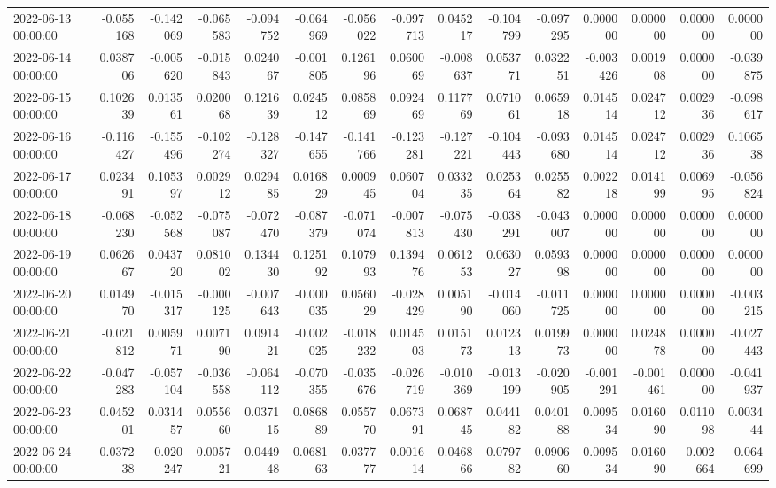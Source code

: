 \begin{tabular}{lrrrrrrrrrrrrrr}
2022-06-13 00:00:00 & -0.055168 & -0.142069 & -0.065583 & -0.094752 & -0.064969 & -0.056022 & -0.097713 & 0.045217 & -0.104799 & -0.097295 & 0.000000 & 0.000000 & 0.000000 & 0.000000 \\
2022-06-14 00:00:00 & 0.038706 & -0.005620 & -0.015843 & 0.024067 & -0.001805 & 0.126196 & 0.060069 & -0.008637 & 0.053771 & 0.032251 & -0.003426 & 0.001908 & 0.000000 & -0.039875 \\
2022-06-15 00:00:00 & 0.102639 & 0.013561 & 0.020068 & 0.121639 & 0.024512 & 0.085869 & 0.092469 & 0.117769 & 0.071061 & 0.065918 & 0.014514 & 0.024712 & 0.002936 & -0.098617 \\
2022-06-16 00:00:00 & -0.116427 & -0.155496 & -0.102274 & -0.128327 & -0.147655 & -0.141766 & -0.123281 & -0.127221 & -0.104443 & -0.093680 & 0.014514 & 0.024712 & 0.002936 & 0.106538 \\
2022-06-17 00:00:00 & 0.023491 & 0.105397 & 0.002912 & 0.029485 & 0.016829 & 0.000945 & 0.060704 & 0.033235 & 0.025364 & 0.025582 & 0.002218 & 0.014199 & 0.006995 & -0.056824 \\
2022-06-18 00:00:00 & -0.068230 & -0.052568 & -0.075087 & -0.072470 & -0.087379 & -0.071074 & -0.007813 & -0.075430 & -0.038291 & -0.043007 & 0.000000 & 0.000000 & 0.000000 & 0.000000 \\
2022-06-19 00:00:00 & 0.062667 & 0.043720 & 0.081002 & 0.134430 & 0.125192 & 0.107993 & 0.139476 & 0.061253 & 0.063027 & 0.059398 & 0.000000 & 0.000000 & 0.000000 & 0.000000 \\
2022-06-20 00:00:00 & 0.014970 & -0.015317 & -0.000125 & -0.007643 & -0.000035 & 0.056029 & -0.028429 & 0.005190 & -0.014060 & -0.011725 & 0.000000 & 0.000000 & 0.000000 & -0.003215 \\
2022-06-21 00:00:00 & -0.021812 & 0.005971 & 0.007190 & 0.091421 & -0.002025 & -0.018232 & 0.014503 & 0.015173 & 0.012313 & 0.019973 & 0.000000 & 0.024878 & 0.000000 & -0.027443 \\
2022-06-22 00:00:00 & -0.047283 & -0.057104 & -0.036558 & -0.064112 & -0.070355 & -0.035676 & -0.026719 & -0.010369 & -0.013199 & -0.020905 & -0.001291 & -0.001461 & 0.000000 & -0.041937 \\
2022-06-23 00:00:00 & 0.045201 & 0.031457 & 0.055660 & 0.037115 & 0.086889 & 0.055770 & 0.067391 & 0.068745 & 0.044182 & 0.040188 & 0.009534 & 0.016090 & 0.011098 & 0.003444 \\
2022-06-24 00:00:00 & 0.037238 & -0.020247 & 0.005721 & 0.044948 & 0.068163 & 0.037777 & 0.001614 & 0.046866 & 0.079782 & 0.090660 & 0.009534 & 0.016090 & -0.002664 & -0.064699 \\

\end{tabular}
